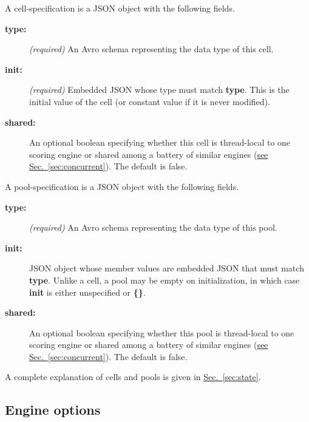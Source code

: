 \documentclass{article}
\newcommand{\PFAc}{\ttfamily\bfseries}
\newenvironment{allowedfields}%
  {\begin{center} \begin{minipage}{0.9\linewidth} \begin{description}}%
  {\end{description} \end{minipage} \end{center}}
\theoremstyle{definition}
\begin{document}
A cell-specification is a JSON object with the following fields.
\begin{allowedfields}
\item[\PFAc type:] {\it (required)} An Avro schema representing the data type of this cell.
\item[\PFAc init:] {\it (required)} Embedded JSON whose type must match {\PFAc type}.  This is the initial value of the cell (or constant value if it is never modified).
\item[\PFAc shared:] An optional boolean specifying whether this cell is thread-local to one scoring engine or shared among a battery of similar engines (\hyperlink{hsec:concurrent}{see Sec.~\ref{sec:concurrent}}).  The default is false.
\end{allowedfields}

A pool-specification is a JSON object with the following fields.
\begin{allowedfields}
\item[\PFAc type:] {\it (required)} An Avro schema representing the data type of this pool.
\item[\PFAc init:] JSON object whose member values are embedded JSON that must match {\PFAc type}.  Unlike a cell, a pool may be empty on initialization, in which case {\PFAc init} is either unspecified or {\PFAc \{\}}.
\item[\PFAc shared:] An optional boolean specifying whether this pool is thread-local to one scoring engine or shared among a battery of similar engines (\hyperlink{hsec:concurrent}{see Sec.~\ref{sec:concurrent}}).  The default is false.
\end{allowedfields}

A complete explanation of cells and pools is given in \hyperlink{hsec:state}{Sec.~\ref{sec:state}}.

\hypertarget{hsec:options}{}
\subsection{Engine options}
\label{sec:options}
\end{document}
